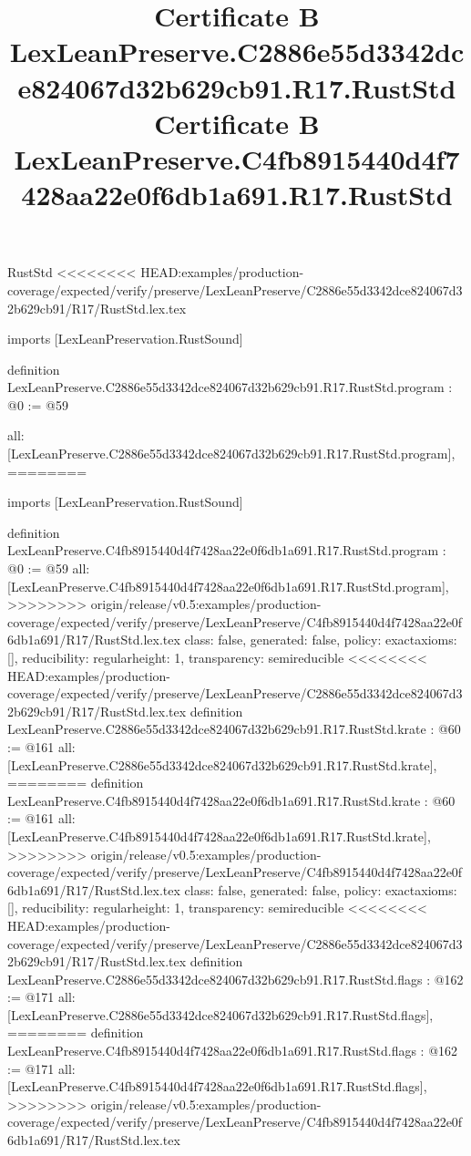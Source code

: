 \begin{lexlean}{RustStd}
<<<<<<<< HEAD:examples/production-coverage/expected/verify/preserve/LexLeanPreserve/C2886e55d3342dce824067d32b629cb91/R17/RustStd.lex.tex
\title{Certificate B LexLeanPreserve.C2886e55d3342dce824067d32b629cb91.R17.RustStd}
\begin{coremodule}
imports [LexLeanPreservation.RustSound]

definition LexLeanPreserve.C2886e55d3342dce824067d32b629cb91.R17.RustStd.program : @0 := @59 {
  all: [LexLeanPreserve.C2886e55d3342dce824067d32b629cb91.R17.RustStd.program],
========
\title{Certificate B LexLeanPreserve.C4fb8915440d4f7428aa22e0f6db1a691.R17.RustStd}
\begin{coremodule}
imports [LexLeanPreservation.RustSound]

definition LexLeanPreserve.C4fb8915440d4f7428aa22e0f6db1a691.R17.RustStd.program : @0 := @59 {
  all: [LexLeanPreserve.C4fb8915440d4f7428aa22e0f6db1a691.R17.RustStd.program],
>>>>>>>> origin/release/v0.5:examples/production-coverage/expected/verify/preserve/LexLeanPreserve/C4fb8915440d4f7428aa22e0f6db1a691/R17/RustStd.lex.tex
  class: false,
  generated: false,
  policy: exact{axioms: []},
  reducibility: regular{height: 1},
  transparency: semireducible
}
<<<<<<<< HEAD:examples/production-coverage/expected/verify/preserve/LexLeanPreserve/C2886e55d3342dce824067d32b629cb91/R17/RustStd.lex.tex
definition LexLeanPreserve.C2886e55d3342dce824067d32b629cb91.R17.RustStd.krate : @60 := @161 {
  all: [LexLeanPreserve.C2886e55d3342dce824067d32b629cb91.R17.RustStd.krate],
========
definition LexLeanPreserve.C4fb8915440d4f7428aa22e0f6db1a691.R17.RustStd.krate : @60 := @161 {
  all: [LexLeanPreserve.C4fb8915440d4f7428aa22e0f6db1a691.R17.RustStd.krate],
>>>>>>>> origin/release/v0.5:examples/production-coverage/expected/verify/preserve/LexLeanPreserve/C4fb8915440d4f7428aa22e0f6db1a691/R17/RustStd.lex.tex
  class: false,
  generated: false,
  policy: exact{axioms: []},
  reducibility: regular{height: 1},
  transparency: semireducible
}
<<<<<<<< HEAD:examples/production-coverage/expected/verify/preserve/LexLeanPreserve/C2886e55d3342dce824067d32b629cb91/R17/RustStd.lex.tex
definition LexLeanPreserve.C2886e55d3342dce824067d32b629cb91.R17.RustStd.flags : @162 := @171 {
  all: [LexLeanPreserve.C2886e55d3342dce824067d32b629cb91.R17.RustStd.flags],
========
definition LexLeanPreserve.C4fb8915440d4f7428aa22e0f6db1a691.R17.RustStd.flags : @162 := @171 {
  all: [LexLeanPreserve.C4fb8915440d4f7428aa22e0f6db1a691.R17.RustStd.flags],
>>>>>>>> origin/release/v0.5:examples/production-coverage/expected/verify/preserve/LexLeanPreserve/C4fb8915440d4f7428aa22e0f6db1a691/R17/RustStd.lex.tex
}}}
\end{coremodule}}
\end{coremodule}
\end{lexlean}
